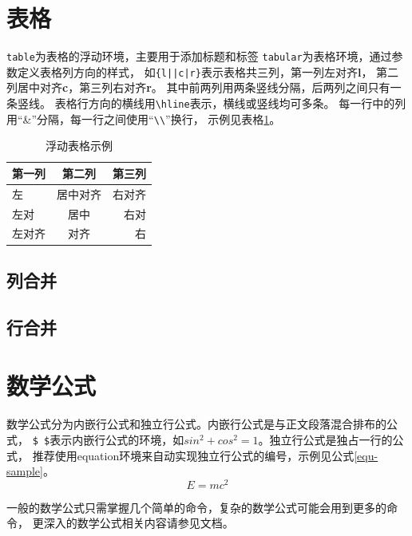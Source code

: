 \section{表格}
\label{sec-table}
\texttt{table}为表格的浮动环境，主要用于添加标题和标签
\texttt{tabular}为表格环境，通过参数定义表格列方向的样式，
如\verb+{l||c|r}+表示表格共三列，第一列左对齐{\bf l}，
第二列居中对齐{\bf c}，第三列右对齐{\bf r}。
其中前两列用两条竖线分隔，后两列之间只有一条竖线。
表格行方向的横线用\verb|\hline|表示，横线或竖线均可多条。
每一行中的列用“\&”分隔，每一行之间使用“\verb|\\|”换行，
示例见表格\ref{tab-sample}。
\begin{table}
    \centering
    \caption{浮动表格示例}
    \label{tab-sample}
    \begin{tabular}{l||c|r}
        \hline
        第一列 & 第二列   & 第三列 \\ \hline \hline
        左     & 居中对齐 & 右对齐 \\ \hline
        左对   & 居中     & 右对   \\ \hline
        左对齐 & 对齐     & 右     \\\hline
    \end{tabular}
\end{table}

\subsection{列合并}
\label{subsec-tab-col}

\subsection{行合并}
\label{subsec-tab-row}

\section{数学公式}
\label{sec-math}
数学公式分为内嵌行公式和独立行公式。内嵌行公式是与正文段落混合排布的公式，
\verb|$ $|表示内嵌行公式的环境，如$sin^2+cos^2=1$。独立行公式是独占一行的公式，
推荐使用equation环境来自动实现独立行公式的编号，示例见公式\ref{equ-sample}。
\begin{equation}
    \label{equ-sample}
    E=mc^2
\end{equation}

一般的数学公式只需掌握几个简单的命令，复杂的数学公式可能会用到更多的命令，
更深入的数学公式相关内容请参见文档。

